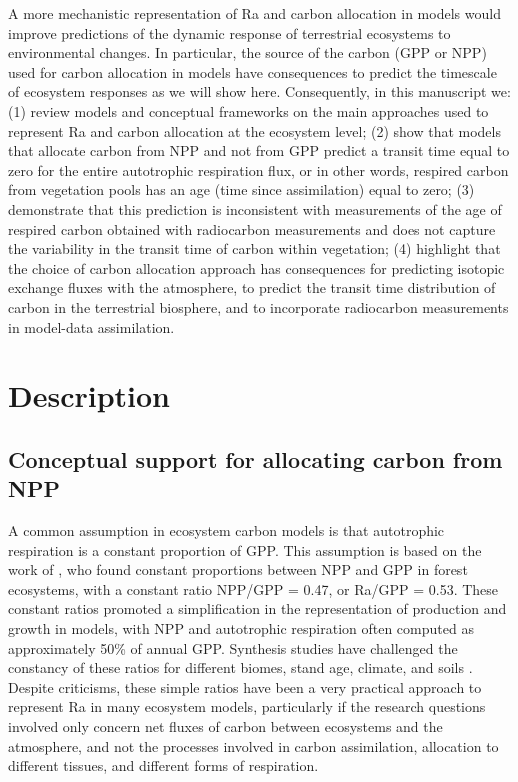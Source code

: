 \documentclass[12pt, a4paper]{article}
\begin{document}
A more mechanistic representation of Ra and carbon allocation in models would improve predictions of the dynamic response of terrestrial ecosystems to environmental changes. In particular, the source of the carbon (GPP or NPP) used for carbon allocation in models have consequences to predict the timescale of ecosystem responses as we will show here. 
Consequently, in this manuscript we: (1) review models and conceptual frameworks on the main approaches used to represent Ra and carbon allocation at the ecosystem level; (2) show that models that allocate carbon from NPP and not from GPP predict a transit time equal to zero for the entire autotrophic respiration flux, or in other words, respired carbon from vegetation pools has an age (time since assimilation) equal to zero; (3) demonstrate that this prediction is inconsistent with measurements of the age of respired carbon obtained with radiocarbon measurements and does not capture the variability in the transit time of carbon within vegetation; (4) highlight that the choice of carbon allocation approach has consequences for predicting isotopic exchange fluxes with the atmosphere, to predict the transit time distribution of carbon in the terrestrial biosphere, and to incorporate radiocarbon measurements in model-data assimilation. 

\section{Description}
\subsection{Conceptual support for allocating carbon from NPP}
A common assumption in ecosystem carbon models is that autotrophic respiration is a constant proportion of GPP. This assumption is based on the work of \citet{Waring1998}, who found constant proportions between NPP and GPP in forest ecosystems, with a constant ratio NPP/GPP = 0.47, or Ra/GPP = 0.53. These constant ratios  promoted  a simplification in the representation of production and growth in models, with NPP and autotrophic respiration often computed as approximately 50\% of annual GPP. Synthesis studies have challenged the constancy of these ratios for different biomes, stand age, climate, and soils \citep{DeLucia2007, Collalti2019}. Despite criticisms, these simple ratios have been a very practical approach to represent Ra in many ecosystem models, particularly if the research questions involved only concern net fluxes of carbon between ecosystems and the atmosphere, and not the processes involved in carbon assimilation, allocation to different tissues, and different forms of respiration.
\end{document}
